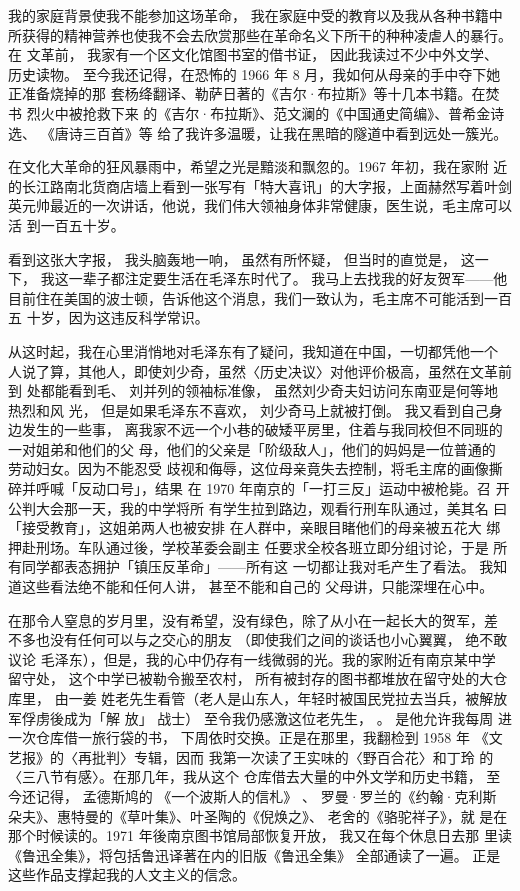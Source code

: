 \begin{preface}
我的家庭背景使我不能参加这场革命， 我在家庭中受的教育以及我从各种书籍中
所获得的精神营养也使我不会去欣赏那些在革命名义下所干的种种凌虐人的暴行。
在 文革前， 我家有一个区文化馆图书室的借书证， 因此我读过不少中外文学、
历史读物。 至今我还记得，在恐怖的 1966 年 8 月，我如何从母亲的手中夺下她
正准备烧掉的那 套杨绛翻译、勒萨日著的《吉尔·布拉斯》等十几本书籍。在焚书
烈火中被抢救下来 的《吉尔·布拉斯》、范文澜的《中国通史简编》、普希金诗选、
《唐诗三百首》等 给了我许多温暖，让我在黑暗的隧道中看到远处一簇光。

在文化大革命的狂风暴雨中，希望之光是黯淡和飘忽的。1967 年初，我在家附
近的长江路南北货商店墙上看到一张写有「特大喜讯」的大字报，上面赫然写着叶剑
英元帅最近的一次讲话，他说，我们伟大领袖身体非常健康，医生说，毛主席可以活
到一百五十岁。

看到这张大字报，
我头脑轰地一响，
虽然有所怀疑，
但当时的直觉是，
这一下，
我这一辈子都注定要生活在毛泽东时代了。
我马上去找我的好友贺军——他
目前住在美国的波士顿，告诉他这个消息，我们一致认为，毛主席不可能活到一百五
十岁，因为这违反科学常识。

从这时起，我在心里消悄地对毛泽东有了疑问，我知道在中国，一切都凭他一个
人说了算，其他人，即使刘少奇，虽然〈历史决议〉对他评价极高，虽然在文革前
到 处都能看到毛、 刘并列的领袖标准像， 虽然刘少奇夫妇访问东南亚是何等地
热烈和风 光， 但是如果毛泽东不喜欢， 刘少奇马上就被打倒。 我又看到自己身
边发生的一些事， 离我家不远一个小巷的破矮平房里，住着与我同校但不同班的
一对姐弟和他们的父 母，他们的父亲是「阶级敌人」，他们的妈妈是一位普通的
劳动妇女。因为不能忍受 歧视和侮辱，这位母亲竟失去控制，将毛主席的画像撕
碎并呼喊「反动口号」，结果 在 1970 年南京的「一打三反」运动中被枪毙。召
开公判大会那一天，我的中学将所 有学生拉到路边，观看行刑车队通过，美其名
曰「接受教育」，这姐弟两人也被安排 在人群中，亲眼目睹他们的母亲被五花大
绑押赴刑场。车队通过後，学校革委会副主 任要求全校各班立即分组讨论，于是
所有同学都表态拥护「镇压反革命」——所有这 一切都让我对毛产生了看法。 我知
道这些看法绝不能和任何人讲， 甚至不能和自己的 父母讲，只能深埋在心中。

在那令人窒息的岁月里，没有希望，没有绿色，除了从小在一起长大的贺军，差
不多也没有任何可以与之交心的朋友 （即使我们之间的谈话也小心翼翼， 绝不敢
议论 毛泽东），但是，我的心中仍存有一线微弱的光。我的家附近有南京某中学
留守处， 这个中学已被勒令搬至农村， 所有被封存的图书都堆放在留守处的大仓
库里， 由一姜 姓老先生看管（老人是山东人，年轻时被国民党拉去当兵，被解放
军俘虏後成为「解 放」 战士） 至令我仍感激这位老先生， 。 是他允许我每周
进一次仓库借一旅行袋的书， 下周依时交换。正是在那里，我翻检到 1958 年
《文艺报》的〈再批判〉专辑，因而 我第一次读了王实味的〈野百合花〉和丁玲
的〈三八节有感〉。在那几年，我从这个 仓库借去大量的中外文学和历史书籍，
至今还记得， 孟德斯鸠的 《一个波斯人的信札》 、 罗曼·罗兰的《约翰·克利斯
朵夫》、惠特曼的《草叶集》、叶圣陶的《倪焕之》、 老舍的《骆驼祥子》，就
是在那个时候读的。1971 年後南京图书馆局部恢复开放， 我又在每个休息日去那
里读《鲁迅全集》，将包括鲁迅译著在内的旧版《鲁迅全集》 全部通读了一遍。
正是这些作品支撑起我的人文主义的信念。


\end{preface}
